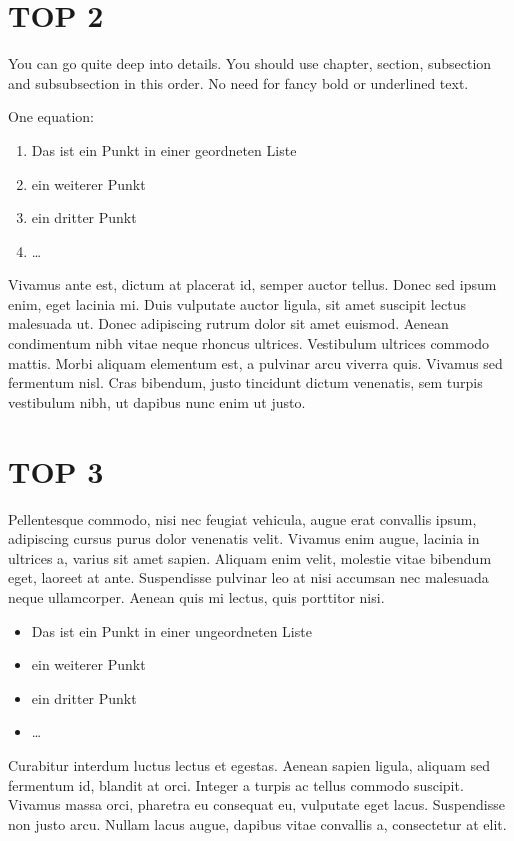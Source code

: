 \documentclass[11pt,a4paper,oneside]{scrartcl}
\begin{document}
\section*{TOP 2}
You can go quite deep into details. You should use chapter, section,
subsection and subsubsection in this order. No need for fancy bold or
underlined text.

One equation:
\begin{enumerate}
    \item Das ist ein Punkt in einer geordneten Liste
    \item ein weiterer Punkt
    \item ein dritter Punkt
    \item \dots
\end{enumerate}

Vivamus ante est, dictum at placerat id, semper auctor tellus. Donec
\arrow sed ipsum enim, eget lacinia mi. Duis vulputate auctor ligula, sit
amet suscipit lectus malesuada ut. Donec adipiscing rutrum dolor sit
amet euismod. Aenean condimentum nibh vitae neque rhoncus ultrices.
Vestibulum ultrices commodo mattis. Morbi aliquam elementum est, a
pulvinar arcu viverra quis. Vivamus sed fermentum nisl. Cras
bibendum, justo tincidunt dictum venenatis, sem turpis vestibulum
nibh, ut dapibus nunc enim ut justo.

\section*{TOP 3}
Pellentesque commodo, nisi nec feugiat vehicula, augue erat convallis ipsum, adipiscing cursus purus dolor venenatis velit. Vivamus enim augue, lacinia in ultrices a, varius sit amet sapien. Aliquam enim velit, molestie vitae bibendum eget, laoreet at ante. Suspendisse pulvinar leo at nisi accumsan nec malesuada neque ullamcorper. Aenean quis mi lectus, quis porttitor nisi.
\begin{itemize}
    \item Das ist ein Punkt in einer ungeordneten Liste
    \item ein weiterer Punkt
    \item ein dritter Punkt
    \item \dots
\end{itemize}
Curabitur interdum luctus lectus et egestas. Aenean sapien ligula, aliquam sed fermentum id, blandit at orci. Integer a turpis ac tellus commodo suscipit. Vivamus massa orci, pharetra eu consequat eu, vulputate eget lacus. Suspendisse non justo arcu. Nullam lacus augue, dapibus vitae convallis a, consectetur at elit.
\end{document}
